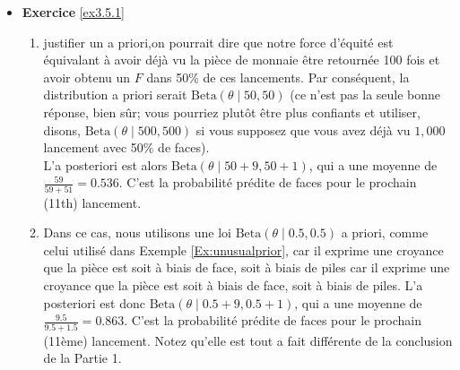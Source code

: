 \begin{itemize}
\newpage\noindent\item \textbf{Exercice }\ref{ex3.5.1}
\begin{enumerate}
	\item justifier un a priori,on pourrait dire que notre force d'\'equit\'e est \'equivalant \`a avoir d\'ej\`a vu la pi\`ece de monnaie être retourn\'ee 100 fois et avoir obtenu un $F$ dans 50\% de ces lancements. Par cons\'equent, la distribution a priori serait  $\text{Beta}(\theta\mid 50,50)$ (ce n'est pas la seule bonne r\'eponse, bien sûr; vous pourriez plutôt être plus confiants et utiliser, disons,  $\text{Beta}(\theta\mid 500,500)$ si vous supposez que vous avez d\'ej\`a vu $1,000$ lancement avec 50\% de faces).\\
	L'a posteriori est alors  $\text{Beta}(\theta\mid 50+9,50+1)$, qui a une moyenne de $\frac{59}{59+51} = 0.536$. C'est la probabilit\'e pr\'edite de faces pour le prochain (11th) lancement.
\item Dans ce cas, nous utilisons une loi $\text{Beta}(\theta\mid 0.5,0.5)$ a priori, comme celui utilis\'e dans Exemple \ref{Ex:unusualprior}, car il exprime une croyance que la pi\`ece est soit \`a biais de face, soit \`a biais de piles car il exprime une croyance que la pi\`ece est soit \`a biais de face, soit \`a biais de piles. \newl L'a posteriori est donc $\text{Beta}(\theta\mid 0.5+9,0.5+1)$, qui a une moyenne de $\frac{9.5}{9.5+1.5} = 0.863$. C'est la probabilit\'e pr\'edite de faces pour le prochain (11\`eme) lancement. Notez qu'elle est tout a fait diff\'erente de la conclusion de la Partie 1.
\end{enumerate}



\end{itemize}
